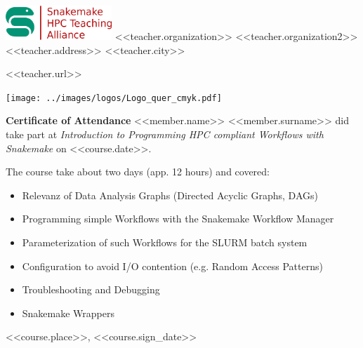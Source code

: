 \documentclass[a4paper,10pt]{article}
\begin{document}
\pagestyle{empty}
\begin{multicols}{2}
 \begin{minipage}{\textwidth}
  \includegraphics[width=4cm]{../images/logos/alliance_logo.png}
  <<teacher.organization>> \newline
  <<teacher.organization2>> \newline
  <<teacher.address>>\newline
  <<teacher.city>>\newline

  <<teacher.url>>
 \end{minipage}

 \columnbreak
 \begin{flushright}
     \texttt{[image: ../images/logos/Logo\_quer\_cmyk.pdf]}
 \end{flushright}

\end{multicols}


\begin{center}
 \vfill
 \huge{\bf Certificate of Attendance}
 \vfill
 \Large{<<member.name>> <<member.surname>>}
 \vfill
 did take part at 
 \vfill
 \emph{Introduction to Programming HPC compliant Workflows with Snakemake}
 \vfill
 on <<course.date>>.
 \vfill
\end{center}

The course take about two days (app. 12 hours) and covered:
\begin{itemize}
  \item Relevanz of Data Analysis Graphs (Directed Acyclic Graphs, DAGs)
  \item Programming simple Workflows with the Snakemake Workflow Manager
  \item Parameterization of such Workflows for the SLURM batch system
  \item Configuration to avoid I/O contention (e.g. Random Access Patterns)
  \item Troubleshooting and Debugging
  \item Snakemake Wrappers
\end{itemize}

\vfill
<<course.place>>, <<course.sign_date>>
\end{document}
